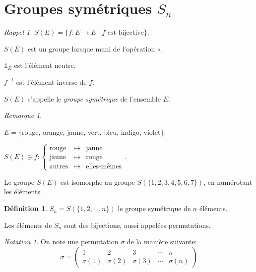 \documentclass{report}
\newcommand*{\identite}{\mathds{1}}
\theoremstyle{definition}
\newtheorem*{defin}{D\'efinition}
\theoremstyle{remark}
\newtheorem*{nota}{Notation}
\newtheorem*{rema}{Remarque}
\newtheorem*{rappel}{Rappel}
\begin{document}
	\section{Groupes sym\'etriques $S_n$}
	\begin{rappel}
		$S(E) = \{f:E \to E \mid f \text{ est bijective}\}$.

		$S(E)$ est un groupe lorsque muni de l'op\'eration $\circ$.

		$\identite_E$ est l'\'el\'ement neutre.

		$f^{-1}$ est l'\'el\'ement inverse de $f$.

		$S(E)$ s'appelle le \emph{groupe sym\'etrique} de l'ensemble $E$.
	\end{rappel}
	\begin{rema}
		~

		$E = \{$rouge, orange, jaune, vert, bleu, indigo, violet$\}$.

		$S(E) \ni f:\left\lbrace \begin{array}{rcl}
			\text{rouge}&\mapsto&\text{jaune}\\
			\text{jaune}&\mapsto&\text{rouge}\\
			\text{autres}&\mapsto&\text{elles-m\^emes}
		\end{array} \right.$.

		Le groupe $S(E)$ est isomorphe au groupe $S(\{1,2,3,4,5,6,7\})$, en num\'erotant les \'el\'ements.
	\end{rema}
	\begin{defin}
		$S_n = S(\{1,2,\dotsb,n\})$ le groupe sym\'etrique de $n$ \'el\'ements.

		Les \'el\'ements de $S_n$ sont des bijections, aussi appel\'ees permutations.
	\end{defin}
	\begin{nota}
		On note une permutation $\sigma$ de la mani\`ere suivante:
		\[
		\sigma=\begin{pmatrix}
			1&2&3&\dotsb&n\\
			\sigma(1)&\sigma(2)&\sigma(3)&\dotsb&\sigma(n)
		\end{pmatrix}
		\]
	\end{nota}
\end{document}
